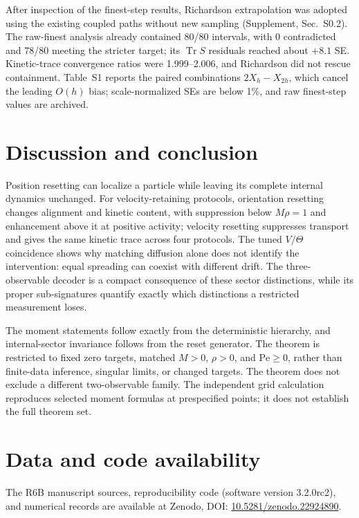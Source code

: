 \begin{samepage}
After inspection of the finest-step results, Richardson extrapolation was adopted using the existing coupled paths without new sampling (Supplement, Sec.~S0.2). The raw-finest analysis already contained 80/80 intervals, with 0 contradicted and 78/80 meeting the stricter target; its $\operatorname{Tr}S$ residuals reached about $+8.1$ SE. Kinetic-trace convergence ratios were 1.999--2.006, and Richardson did not rescue containment. Table~S1 reports the paired combinations $2X_h-X_{2h}$, which cancel the leading $O(h)$ bias; scale-normalized SEs are below 1\%, and raw finest-step values are archived.
\par\end{samepage}

\section{Discussion and conclusion}\label{discussion}

Position resetting can localize a particle while leaving its complete internal dynamics unchanged. For velocity-retaining protocols, orientation resetting changes alignment and kinetic content, with suppression below $M\rho=1$ and enhancement above it at positive activity; velocity resetting suppresses transport and gives the same kinetic trace across four protocols. The tuned $V/\Theta$ coincidence shows why matching diffusion alone does not identify the intervention: equal spreading can coexist with different drift. The three-observable decoder is a compact consequence of these sector distinctions, while its proper sub-signatures quantify exactly which distinctions a restricted measurement loses.

The moment statements follow exactly from the deterministic hierarchy, and internal-sector invariance follows from the reset generator. The theorem is restricted to fixed zero targets, matched $M>0$, $\rho>0$, and $\mathrm{Pe}\ge0$, rather than finite-data inference, singular limits, or changed targets. The theorem does not exclude a different two-observable family. The independent grid calculation reproduces selected moment formulas at prespecified points; it does not establish the full theorem set.

\section{Data and code availability}\label{data-and-code-availability}

The R6B manuscript sources, reproducibility code (software version 3.2.0rc2), and numerical records are available at Zenodo, DOI: \href{https://doi.org/10.5281/zenodo.22924890}{10.5281/zenodo.22924890}.
